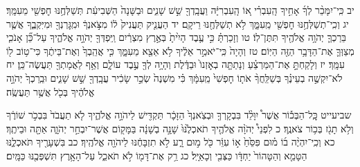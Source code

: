 \documentclass[twoside, openany, parskip=half, 11pt]{book}
\begin{document}
יב כִּֽי־יִמָּכֵ֨ר לְךָ֜ אָחִ֣יךָ הָֽעִבְרִ֗י א֚וֹ הָֽעִבְרִיָּ֔ה וַעֲבָֽדְךָ֖ שֵׁ֣שׁ שָׁנִ֑ים וּבַשָּׁנָה֙ הַשְּׁבִיעִ֔ת תְּשַׁלְּחֶ֥נּוּ חׇפְשִׁ֖י מֵעִמָּֽךְ׃ יג וְכִֽי־תְשַׁלְּחֶ֥נּוּ חׇפְשִׁ֖י מֵֽעִמָּ֑ךְ לֹ֥א תְשַׁלְּחֶ֖נּוּ רֵיקָֽם׃ יד הַעֲנֵ֤יק תַּעֲנִיק֙ ל֔וֹ מִצֹּ֣אנְךָ֔ וּמִֽגׇּרְנְךָ֖ וּמִיִּקְבֶ֑ךָ אֲשֶׁ֧ר בֵּרַכְךָ֛ יְהֹוָ֥ה אֱלֹהֶ֖יךָ תִּתֶּן־לֽוֹ׃ טו וְזָכַרְתָּ֗ כִּ֣י עֶ֤בֶד הָיִ֙יתָ֙ בְּאֶ֣רֶץ מִצְרַ֔יִם וַֽיִּפְדְּךָ֖ יְהֹוָ֣ה אֱלֹהֶ֑יךָ עַל־כֵּ֞ן אָנֹכִ֧י מְצַוְּךָ֛ אֶת־הַדָּבָ֥ר הַזֶּ֖ה הַיּֽוֹם׃ טז וְהָיָה֙ כִּֽי־יֹאמַ֣ר אֵלֶ֔יךָ לֹ֥א אֵצֵ֖א מֵעִמָּ֑ךְ כִּ֤י אֲהֵֽבְךָ֙ וְאֶת־בֵּיתֶ֔ךָ כִּי־ט֥וֹב ל֖וֹ עִמָּֽךְ׃ יז וְלָקַחְתָּ֣ אֶת־הַמַּרְצֵ֗עַ וְנָתַתָּ֤ה בְאׇזְנוֹ֙ וּבַדֶּ֔לֶת וְהָיָ֥ה לְךָ֖ עֶ֣בֶד עוֹלָ֑ם וְאַ֥ף לַאֲמָתְךָ֖ תַּעֲשֶׂה־כֵּֽן׃ יח לֹא־יִקְשֶׁ֣ה בְעֵינֶ֗ךָ בְּשַׁלֵּֽחֲךָ֨ אֹת֤וֹ חׇפְשִׁי֙ מֵֽעִמָּ֔ךְ כִּ֗י מִשְׁנֶה֙ שְׂכַ֣ר שָׂכִ֔יר עֲבָֽדְךָ֖ שֵׁ֣שׁ שָׁנִ֑ים וּבֵֽרַכְךָ֙ יְהֹוָ֣ה אֱלֹהֶ֔יךָ בְּכֹ֖ל אֲשֶׁ֥ר תַּעֲשֶֽׂה׃

שביעייט כׇּֽל־הַבְּכ֡וֹר אֲשֶׁר֩ יִוָּלֵ֨ד בִּבְקָרְךָ֤ וּבְצֹֽאנְךָ֙ הַזָּכָ֔ר תַּקְדִּ֖ישׁ לַיהֹוָ֣ה אֱלֹהֶ֑יךָ לֹ֤א תַעֲבֹד֙ בִּבְכֹ֣ר שׁוֹרֶ֔ךָ וְלֹ֥א תָגֹ֖ז בְּכ֥וֹר צֹאנֶֽךָ׃ כ לִפְנֵי֩ יְהֹוָ֨ה אֱלֹהֶ֤יךָ תֹאכְלֶ֙נּוּ֙ שָׁנָ֣ה בְשָׁנָ֔ה בַּמָּק֖וֹם אֲשֶׁר־יִבְחַ֣ר יְהֹוָ֑ה אַתָּ֖ה וּבֵיתֶֽךָ׃ כא וְכִֽי־יִהְיֶ֨ה ב֜וֹ מ֗וּם פִּסֵּ֙חַ֙ א֣וֹ עִוֵּ֔ר כֹּ֖ל מ֣וּם רָ֑ע לֹ֣א תִזְבָּחֶ֔נּוּ לַיהֹוָ֖ה אֱלֹהֶֽיךָ׃ כב בִּשְׁעָרֶ֖יךָ תֹּאכְלֶ֑נּוּ הַטָּמֵ֤א וְהַטָּהוֹר֙ יַחְדָּ֔ו כַּצְּבִ֖י וְכָאַיָּֽל׃ כג רַ֥ק אֶת־דָּמ֖וֹ לֹ֣א תֹאכֵ֑ל עַל־הָאָ֥רֶץ תִּשְׁפְּכֶ֖נּוּ כַּמָּֽיִם׃
\end{document}
